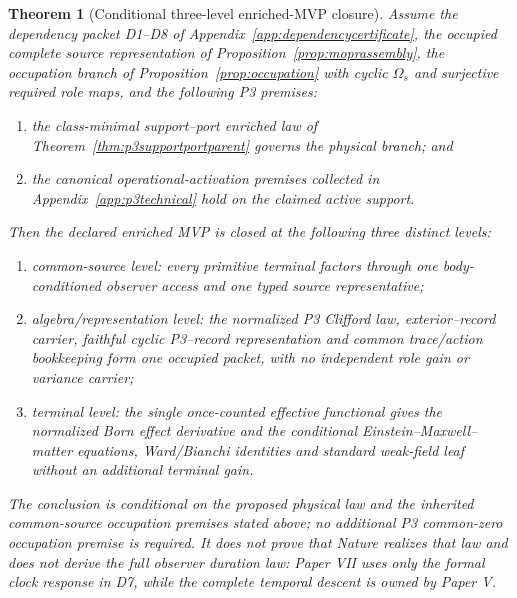 \documentclass[11pt]{article}
\newtheorem{theorem}{Theorem}
\begin{document}
\begin{theorem}[Conditional three-level enriched-MVP closure]
\label{thm:threelevelclosure}
Assume the dependency packet D1--D8 of
Appendix~\ref{app:dependencycertificate}, the occupied complete source
representation of Proposition~\ref{prop:moprassembly}, the occupation
branch of Proposition~\ref{prop:occupation} with cyclic $\Omega_s$ and
surjective required role maps, and the following P3 premises:
\begin{enumerate}[label=(\roman*),nosep]
\item the class-minimal support--port enriched law of
  Theorem~\ref{thm:p3supportportparent} governs the physical branch; and
\item the canonical operational-activation premises collected in
  Appendix~\ref{app:p3technical} hold on the claimed active support.
\end{enumerate}
Then the declared enriched MVP is closed at the following three distinct
levels:
\begin{enumerate}
\item \emph{common-source level:} every primitive terminal factors through
  one body-conditioned observer access and one typed source representative;
\item \emph{algebra/representation level:} the normalized P3 Clifford law,
  exterior--record carrier, faithful cyclic P3--record representation and
  common trace/action bookkeeping form one occupied packet, with no
  independent role gain or variance carrier;
\item \emph{terminal level:} the single once-counted effective functional
  gives the normalized Born effect derivative and the conditional
  Einstein--Maxwell--matter equations, Ward/Bianchi identities and standard
  weak-field leaf without an additional terminal gain.
\end{enumerate}
The conclusion is conditional on the proposed physical law and the inherited
common-source occupation premises stated above; no additional P3
common-zero occupation premise is required.  It does not prove that Nature
realizes that law and does
not derive the full observer duration law: Paper VII uses only the formal
clock response in D7, while the complete temporal descent is owned by Paper V.
\end{theorem}
\end{document}
